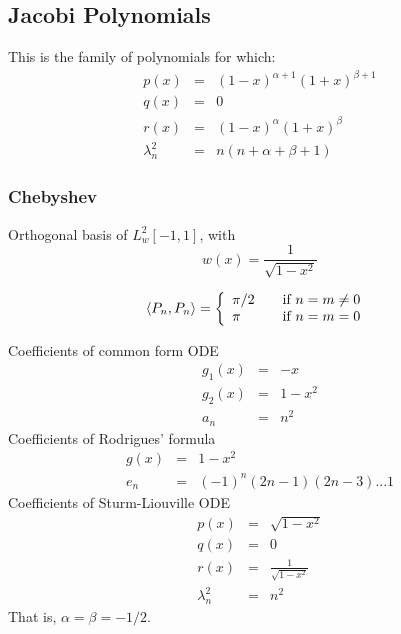 \documentclass[11pt]{article}
\begin{document}
\subsection{Jacobi Polynomials}
This is the family of polynomials for which:
\begin{eqnarray*}
p(x) &=& (1 - x)^{\alpha + 1}(1+x)^{\beta + 1}\\
q(x) &=& 0\\
r(x) &=& (1 - x)^\alpha(1+x)^\beta \\
\lambda_n^2 &=& n(n + \alpha + \beta + 1)
\end{eqnarray*}

\subsubsection{Chebyshev}
Orthogonal basis of $L^2_w[-1,1]$, with
\[w(x) = \frac{1}{\sqrt{1 - x^2}}\] 

\[\langle P_n,P_n\rangle = \left\{ 
  \begin{array}{l l}
    \pi/2 & \quad \text{if $n = m \neq 0$ }\\
    \pi & \quad \text{if $n=m=0$ }
  \end{array} \right.\]
  
Coefficients of common form ODE
\begin{eqnarray*}
g_1(x) &=& -x\\
g_2(x) &=& 1 - x^2\\
a_n &=& n^2
\end{eqnarray*}
Coefficients of Rodrigues' formula
 \begin{eqnarray*}
g(x) &=& 1 - x^2\\
e_n &=& (-1)^n(2n-1)(2n-3)...1
\end{eqnarray*}
Coefficients of Sturm-Liouville ODE
\begin{eqnarray*}
p(x) &=& \sqrt{1 - x^2}\\
q(x) &=& 0\\
r(x) &=& \frac{1}{\sqrt{1 - x^2}}\\
\lambda^2_n &=& n^2
\end{eqnarray*}
That is, $\alpha = \beta = -1/2$.
\end{document}
